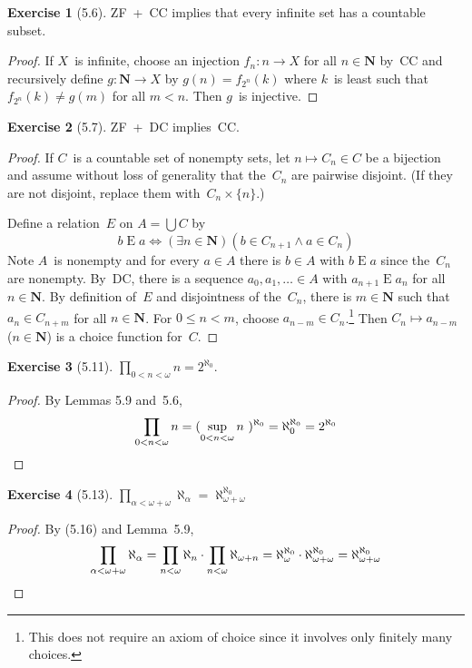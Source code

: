 \documentclass[letterpaper,12pt]{article}
\newcommand{\N}{\boldsymbol{N}}
\newcommand{\bigunion}{\bigcup}
\newcommand{\mult}{\cdot}
\theoremstyle{definition}
\newtheorem*{exer}{Exercise}
\theoremstyle{remark}
\begin{document}
\begin{exer}[5.6]
ZF~+~CC implies that every infinite set has a countable subset.
\end{exer}
\begin{proof}
If \(X\)~is infinite, choose an injection \(f_n:n\to X\) for all \(n\in\N\) by~CC and recursively define \(g:\N\to X\) by \(g(n)=f_{2^n}(k)\) where \(k\)~is least such that \(f_{2^n}(k)\ne g(m)\) for all \(m<n\). Then \(g\)~is injective.
\end{proof}

\begin{exer}[5.7]
ZF~+~DC implies~CC.
\end{exer}
\begin{proof}
If \(C\)~is a countable set of nonempty sets, let \(n\mapsto C_n\in C\) be a bijection and assume without loss of generality that the~\(C_n\) are pairwise disjoint. (If they are not disjoint, replace them with~\(C_n\times\{n\}\).)

Define a relation~\(E\) on \(A=\bigunion C\) by
\[b\mathrel{E}a\iff(\exists n\in\N)(b\in C_{n+1}\land a\in C_n)\]
Note \(A\)~is nonempty and for every \(a\in A\) there is \(b\in A\) with \(b\mathrel{E}a\) since the~\(C_n\) are nonempty. By~DC, there is a sequence \(a_0,a_1,\ldots\in A\) with \(a_{n+1}\mathrel{E}a_n\) for all \(n\in\N\). By definition of~\(E\) and disjointness of the~\(C_n\), there is \(m\in\N\) such that \(a_n\in C_{n+m}\) for all \(n\in\N\). For \(0\le n<m\), choose \(a_{n-m}\in C_n\).\footnote{This does not require an axiom of choice since it involves only finitely many choices.} Then \(C_n\mapsto a_{n-m}\) (\(n\in\N\)) is a choice function for~\(C\).
\end{proof}

\begin{exer}[5.11]
\(\prod_{0<n<\omega}n=2^{\aleph_0}\).
\end{exer}
\begin{proof}
By Lemmas 5.9 and~5.6,
\[\prod_{0<n<\omega}n=(\sup_{0<n<\omega}n\ )^{\aleph_0}=\aleph_0^{\aleph_0}=2^{\aleph_0}\qedhere\]
\end{proof}

\begin{exer}[5.13]
\(\prod_{\alpha<\omega+\omega}\aleph_{\alpha}=\aleph_{\omega+\omega}^{\aleph_0}\)
\end{exer}
\begin{proof}
By (5.16) and Lemma~5.9,
\[\prod_{\alpha<\omega+\omega}\aleph_{\alpha}=\prod_{n<\omega}\aleph_n\mult\prod_{n<\omega}\aleph_{\omega+n}=\aleph_{\omega}^{\aleph_0}\mult\aleph_{\omega+\omega}^{\aleph_0}=\aleph_{\omega+\omega}^{\aleph_0}\qedhere\]
\end{proof}
\end{document}
